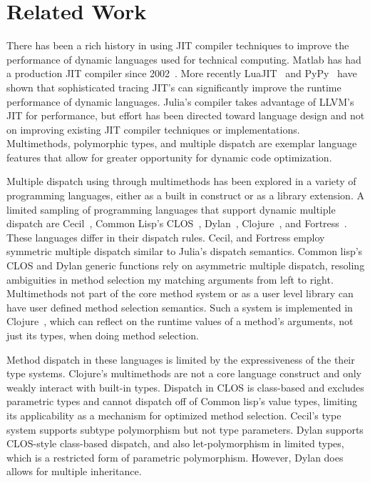 \section{Related Work}

There has been a rich history in using JIT compiler techniques to improve the performance of dynamic languages used for technical computing. 
Matlab has had a production JIT compiler since 2002~\cite{matlab2002matlab}.
More recently LuaJIT~\cite{pall2008luajit} and PyPy~\cite{Bolz2009} have shown that sophisticated tracing JIT's can significantly improve the runtime performance of dynamic languages.
Julia's compiler takes advantage of LLVM's JIT for performance, but effort has been directed toward language design and not on improving existing JIT compiler techniques or implementations.
Multimethods, polymorphic types, and multiple dispatch are exemplar language features that allow for greater opportunity for dynamic code optimization.

Multiple dispatch using through multimethods has been explored in a variety of programming languages, either as a built in construct or as a library extension.
A limited sampling of programming languages that support dynamic multiple dispatch are Cecil~\cite{Chambers1992,Chambers1994}, Common Lisp's CLOS~\cite{Bobrow1988}, Dylan~\cite{dylanman}, Clojure~\cite{Hickey2008}, and Fortress~\cite{Allen2011}.
These languages differ in their dispatch rules.  
Cecil, and Fortress employ symmetric multiple dispatch similar to Julia's dispatch semantics.
Common lisp's CLOS and Dylan generic functions rely on asymmetric multiple dispatch, resoling ambiguities in method selection my matching arguments from left to right.
Multimethods not part of the core method system or as a user level library can have user defined method selection semantics.
Such a system is implemented in Clojure~\cite{Hickey2008}, which can reflect on the runtime values of a method's arguments, not just its types, when doing method selection.

Method dispatch in these languages is limited by the expressiveness of the their type systems.
Clojure's multimethods are not a core language construct and only weakly interact with built-in types.
Dispatch in CLOS is class-based and excludes parametric types and cannot dispatch off of Common lisp's value types, limiting its applicability as a mechanism for optimized method selection.  
Cecil's type system supports subtype polymorphism but not type parameters.
Dylan supports CLOS-style class-based dispatch, and also let-polymorphism in limited types, which is a restricted form of parametric polymorphism.
However, Dylan does allows for multiple inheritance. 

